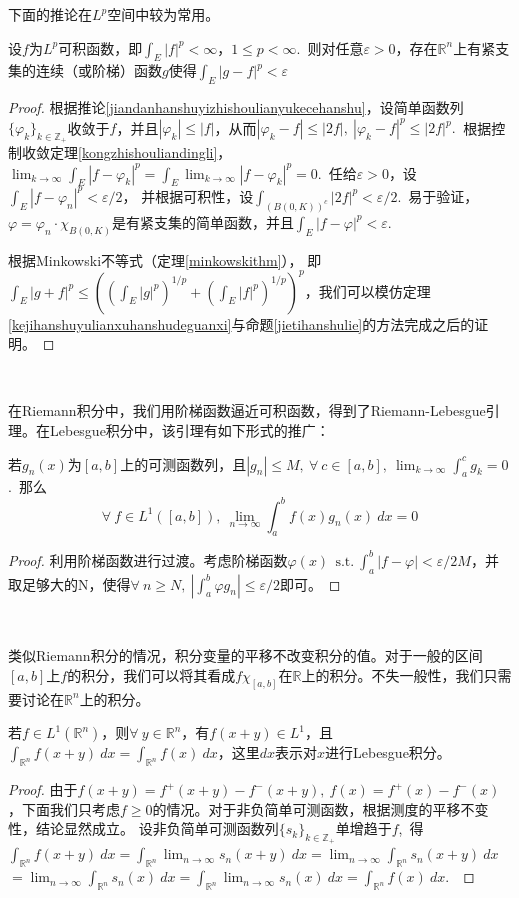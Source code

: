 \documentclass[color=green,thmcnt=section,lang=cn,12pt]{elegantbook}
\numberwithin{equation}{section}%
\numberwithin{figure}{section}%
\newcommand{\RR}{\mathbb{R}}
\renewcommand{\RN}{\RR^n}
\newcommand{\ZZ}{\mathbb{Z}}
\newcommand{\ee}{\varepsilon}
\newcommand{\any}{\forall \ }
\newcommand{\sothat}{\ \textrm{s.t.}\ }
\newcommand{\csf}[1]{\{#1_k\}_{k\in \ZZ_+}} %
\begin{document}
下面的推论在$L^p$空间中较为常用。
\begin{corollary}\label{lpkefenyinli}
    设$f$为$L^p$可积函数，即$\int_{E}|f|^p<\infty$，$1\leq p<\infty$.\ 则对任意$\ee>0$，存在$\RN$上有紧支集的连续（或阶梯）函数$g$使得$\int_E|g-f|^p<\ee$
\end{corollary}
\begin{proof}
    根据推论\ref{jiandanhanshuyizhishoulianyukecehanshu}，设简单函数列$\csf{\varphi}$收敛于$f$，并且$|\varphi_k|\leq |f|$，从而$|\varphi_k-f|\leq |2f|,\ |\varphi_k-f|^p\leq |2f|^p.\ $
    根据控制收敛定理\ref{kongzhishouliandingli}，$\lim_{k\to\infty}\int_E|f-\varphi_k|^p=\int_E\lim_{k\to\infty}|f-\varphi_k|^p=0$.\ 任给$\ee>0$，设$\int_{E}|f-\varphi_n|^p<\ee/2$，
    并根据可积性，设$\int_{(B(0,K))^c}|2f|^p<\ee/2$.\ 易于验证，$\varphi=\varphi_n\cdot \chi_{B(0,K)}$是有紧支集的简单函数，并且$\int_E|f-\varphi|^p<\ee$.\ 
    

    根据Minkowski不等式（定理\ref{minkowskithm}），
    即
    $\int_E|g+f|^p\leq ((\int_E|g|^p)^{1/p}+(\int_E|f|^p)^{1/p})^p$，我们可以模仿定理\ref{kejihanshuyulianxuhanshudeguanxi}与命题\ref{jietihanshulie}的方法完成之后的证明。
\end{proof}
\ 


在Riemann积分中，我们用阶梯函数逼近可积函数，得到了Riemann-Lebesgue引理。在Lebesgue积分中，该引理有如下形式的推广：
\begin{lemma}\label{riemannlebesgueyinli}
    若$g_n(x)$为$[a,b]$上的可测函数列，且$|g_n|\leq M,\ \any c\in [a,b],\ \lim_{k\to\infty}\int_{a}^{c}g_k=0$.\ 那么
    \begin{equation*}
        \any f\in L^1([a,b]),\ \lim_{n\to\infty}\int_{a}^{b}f(x)g_n(x)\ dx=0
    \end{equation*}
\end{lemma}
\begin{proof}
    利用阶梯函数进行过渡。考虑阶梯函数$\varphi(x)\ \sothat \int_{a}^{b}|f-\varphi|<\ee/2M$，并取足够大的N，使得$\any n\geq N,\ |\int_{a}^{b}\varphi g_n|\leq \ee/2$即可。
\end{proof}
\ 


类似Riemann积分的情况，积分变量的平移不改变积分的值。对于一般的区间$[a,b]$上$f$的积分，我们可以将其看成$f\chi_{[a,b]}$在$\RR$上的积分。不失一般性，我们只需要讨论在$\RN$上的积分。
\begin{proposition}[积分变量的平移]\label{jifenbianliangdepinyi}
    若$f\in L^1(\RN)$，则$\any y\in\RN$，有$f(x+y)\in L^1$，且$\int_{\RN}f(x+y)\ dx=\int_{\RN}f(x)\ dx$，这里$dx$表示对$x$进行Lebesgue积分。
\end{proposition}
\begin{proof}
    由于$f(x+y)=f^+(x+y)-f^-(x+y),\ f(x)=f^+(x)-f^-(x)$，下面我们只考虑$f\geq 0$的情况。对于非负简单可测函数，根据测度的平移不变性，结论显然成立。
    设非负简单可测函数列$\csf{s}$单增趋于$f$,\ 得$\int_{\RN}f(x+y)\ dx=\int_{\RN}\lim_{n\to\infty}s_n(x+y)\ dx=\lim_{n\to\infty}\int_{\RN}s_n(x+y)\ dx$
    $=\lim_{n\to\infty}\int_{\RN}s_n(x)\ dx=\int_{\RN}\lim_{n\to\infty}s_n(x)\ dx=\int_{\RN}f(x)\ dx$.\ 
\end{proof}
\ 
\end{document}
